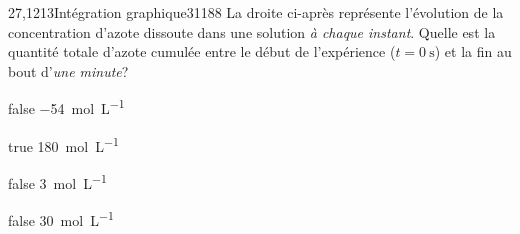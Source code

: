 		\begin{question}{27,1213}{Intégration graphique}{3}{1188}
           La droite ci-après représente l'évolution de la concentration d'azote dissoute dans une solution \emph{à chaque instant}. Quelle est la quantité totale d'azote cumulée entre le début de l'expérience ($t=\SI{0}{\second}$) et la fin au bout d'\emph{une minute}?
            \begin{figure}
             \end{figure}
        \end{question}
        \begin{reponses}
            \item[false] \SI{-54}{\mol\per\liter}
		    \item[true] \SI{180}{\mol\per\liter}
		    \item[false] \SI{3}{\mol\per\liter}
		    \item[false] \SI{30}{\mol\per\liter}
		    \end{reponses}
